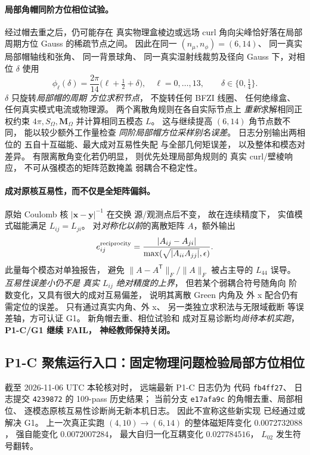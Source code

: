 \paragraph{局部角帽同阶方位相位试验。}
经过帽去重之后，仍可能存在
真实物理盒棱边或远场 curl
角向尖峰恰好落在局部
周期方位 Gauss 的稀疏节点之间。
因此在同一 $(n_\mu,n_\phi)=(6,14)$、
同一真实局部帽轴线和张角、
同一背景球角、
同一真实湿射线裁剪及径向 Gauss
下，对相位 $\delta$
使用
\[
 \phi_\ell(\delta)=
 \frac{2\pi}{14}
 \bigl(\ell+\tfrac12+\delta\bigr),
 \quad \ell=0,\ldots,13,
 \qquad \delta\in\{0,\tfrac14\}.
\]
$\delta$ 只旋转\emph{局部帽的周期
方位求积节点}，
不旋转任何 BFZI 线圈、
任何绝缘盒、
任何真实模式电流或物理源。
两个离散角规则在各自实际节点上
\emph{重新}求解相同正权约束
$4\pi,S_\Omega,\bm M_\Omega$
并计算相同五模态 $L$。
这与继续提高 $(6,14)$
角节点数不同，
能以较少额外工作量检查
\emph{同阶局部帽方位采样别名误差}。
日志分别输出两相位的
五自十互磁能、最大成对互易性失配
与全部几何矩误差，
以及整体和模态对差异。
有限离散角变化若仍明显，
则优先处理局部角规则的
真实 curl/壁棱响应，
不可从强模态的矩阵范数掩盖
弱耦合不稳定性。

\paragraph{成对原核互易性，而不仅是全矩阵偏斜。}
原始 Coulomb 核
$|\bm x-\bm y|^{-1}$ 在交换
源/观测点后不变，
故在连续精度下，
实值模式磁能满足
$L_{ij}=L_{ji}$。
对\emph{对称化以前}的离散矩阵
$A$，额外输出
\[
 e_{ij}^{\rm reciprocity}=
 \frac{|A_{ij}-A_{ji}|}
 {\max(\sqrt{|A_{ii}A_{jj}|},\epsilon)}.
\]
此量每个模态对单独报告，
避免 $\|A-A^\mathsf T\|_F/
\|A\|_F$ 被占主导的
$L_{44}$ 误导。
\emph{互易性误差小仍不是
真实 $L_{ij}$ 绝对精度的上界}，
但若某个弱耦合符号随角向
阶数变化，又具有很大的成对互易偏差，
说明其离散 Green 内角及
外 x 配合仍有需定位的误差。
只有通过真实内角、外 x、
另一类独立求积法与无限域截断
等误差轴，方可认证 G1。
新角帽去重、相位试验和
成对互易诊断均\emph{尚待本机实跑}，
\textbf{P1-C/G1 继续 FAIL，
神经教师保持关闭。}


\subsection{P1-C 聚焦运行入口：固定物理问题检验局部方位相位}
\label{sec:p1-c-fast-focused-physical-run}
截至 2026-11-06 UTC 本轮核对时，
远端最新 P1-C 日志仍为
代码 \texttt{fb4ff27}、
日志提交 \texttt{4239872} 的
109-pass 历史结果；
当前分支 \texttt{e17afa9c}
的角帽去重、局部相位、
逐模态原核互易性诊断尚无新本机日志。
因此不宣称这些新实现
已经通过或解决 G1。
上一次真正实跑
$(4,10)\to(6,14)$
的整体磁矩阵变化
$0.0072732088$，
强自能变化 $0.0072007284$，
最大自归一化互耦变化
$0.027784516$，
$L_{02}$ 发生符号翻转。

